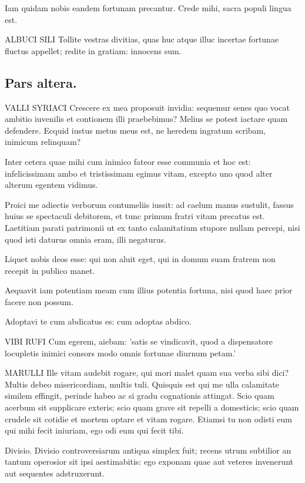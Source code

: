 Iam quidam nobis eandem fortunam precantur. Crede mihi, sacra populi lingua est.

\bigskip

ALBUCI SILI Tollite vestras divitias, quas huc atque illuc incertae fortunae fluctus appellet; redite in gratiam: innocens sum. 	


\subsection*{Pars altera.}

VALLI SYRIACI Crescere ex mea proposuit invidia: sequemur senes quo vocat ambitio iuvenilis et contionem illi praebebimus? Melius se potest iactare quam defendere. Ecquid iustus metus meus est, ne heredem ingratum scribam, inimicum relinquam? 

Inter cetera quae mihi cum inimico fateor esse communia et hoc est: infelicissimam ambo et tristissimam egimus vitam, excepto uno quod alter alterum egentem vidimus. 

Proici me adiectis verborum contumeliis iussit: ad caelum manus sustulit, fassus huius se spectaculi debitorem, et tunc primum fratri vitam precatus est. Laetitiam parati patrimonii ut ex tanto calamitatium stupore nullam percepi, nisi quod isti daturus omnia eram, illi negaturus. 

Liquet nobis deos esse: qui non aluit eget, qui in domum suam fratrem non recepit in publico manet. 

Aequavit iam potentiam meam cum illius potentia fortuna, nisi quod haec prior facere non possum. 

Adoptavi te cum abdicatus es: cum adoptas abdico.

\bigskip

VIBI RUFI Cum egerem, aiebam: 'satis se vindicavit, quod a dispensatore locupletis inimici consors modo omnis fortunae diurnum petam.'

\bigskip

MARULLI Ille vitam audebit rogare, qui mori malet quam sua verba sibi dici? Multis debeo misericordiam, multis tuli. Quisquis est qui me ulla calamitate similem effingit, perinde habeo ac si gradu cognationis attingat. Scio quam acerbum sit supplicare exteris; scio quam grave sit repelli a domesticis; scio quam crudele sit cotidie et mortem optare et vitam rogare. Etiamsi tu non odisti eum qui mihi fecit iniuriam, ego odi eum qui fecit tibi. 

\bigskip	

Divisio. Divisio controversiarum antiqua simplex fuit; recens utrum subtilior an tantum operosior sit ipsi aestimabitis: ego exponam quae aut veteres invenerunt aut sequentes adstruxerunt. 	

